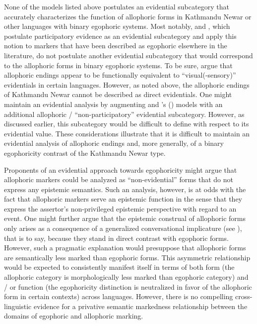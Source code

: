 \documentclass[output=paper]{langsci/langscibook}
\begin{document}
None of the models listed above postulates an evidential subcategory that accurately characterizes the function of allophoric forms in Kathmandu Newar or other languages with binary egophoric systems. Most notably, \cite{Plungian2010} and \cite{SanRoqueLoughnane2012}, which postulate participatory evidence as an evidential subcategory and apply this notion to markers that have been described as egophoric elsewhere in the literature, do not postulate another evidential subcategory that would correspond to the allophoric forms in binary egophoric systems. To be sure, \cite[158]{SanRoqueLoughnane2012} argue that allophoric endings appear to be functionally equivalent to “visual(-sensory)” evidentials in certain languages. However, as noted above, the allophoric endings of Kathmandu Newar cannot be described as direct evidentials. One might maintain an evidential analysis by augmenting \cite{Plungian2010} and \citeauthor{SanRoqueLoughnane2012}’s (\citeyear{SanRoqueLoughnane2012}) models with an additional allophoric / “non-participatory” evidential subcategory. However, as discussed earlier, this subcategory would be difficult to define with respect to its evidential value. These considerations illustrate that it is difficult to maintain an evidential analysis of allophoric endings and, more generally, of a binary egophoricity contrast of the Kathmandu Newar type.

Proponents of an evidential approach towards egophoricity might argue that allophoric markers could be analyzed as “non-evidential” forms that do not express any epistemic semantics. Such an analysis, however, is at odds with the fact that allophoric markers serve an epistemic function in the sense that they express the assertor’s non-privileged epistemic perspective with regard to an event. One might further argue that the epistemic construal of allophoric forms only arises as a consequence of a generalized conversational implicature (see \citealt{Levinson2000}), that is to say, because they stand in direct contrast with egophoric forms. However, such a pragmatic explanation would presuppose that allophoric forms are semantically less marked than egophoric forms. This asymmetric relationship would be expected to consistently manifest itself in terms of both form (the allophoric category is morphologically less marked than egophoric category) and / or function (the egophoricity distinction is neutralized in favor of the allophoric form in certain contexts) across languages. However, there is no compelling cross-linguistic evidence for a privative semantic markedness relationship between the domains of egophoric and allophoric marking.
\end{document}
